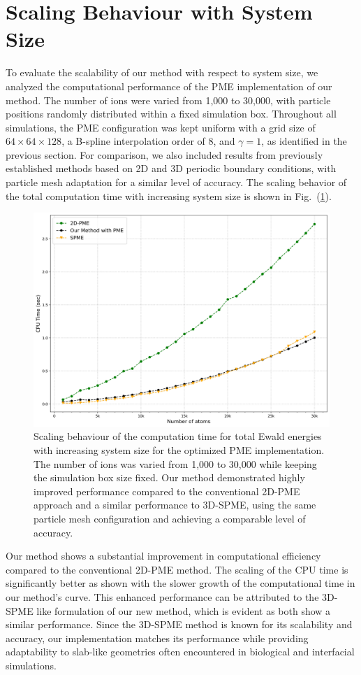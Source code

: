 \section{Scaling Behaviour with System Size}
To evaluate the scalability of our method with respect to system size, we analyzed the computational performance of the PME implementation of our method. The number of ions were varied from 1,000 to 30,000, with particle positions randomly distributed within a fixed simulation box. Throughout all simulations, the PME configuration was kept uniform with a grid size of $64 \times 64 \times 128$, a B-spline interpolation order of 8, and $\gamma = 1$, as identified in the previous section. For comparison, we also included results from previously established methods based on 2D and 3D periodic boundary conditions, with particle mesh adaptation for a similar level of accuracy. The scaling behavior of the total computation time with increasing system size is shown in Fig.~(\ref{fig:scaling_results}). 
\begin{figure}[]
    \centering
    \includegraphics[width=\linewidth]{images/Scaling_behaviour_Result30k.jpg}
    \caption{Scaling behaviour of the computation time for total Ewald energies with increasing system size for the optimized PME implementation. The number of ions was varied from 1,000 to 30,000 while keeping the simulation box size fixed.  Our method demonstrated highly improved performance compared to the conventional \ac{2D-PME} approach and a similar performance to 3D-\ac{SPME}, using the same particle mesh configuration and achieving a comparable level of accuracy.}
    \label{fig:scaling_results}
\end{figure}
Our method shows a substantial improvement in computational efficiency compared to the conventional \ac{2D-PME} method. The scaling of the CPU time is significantly better as shown with the slower growth of the computational time in our method's curve. This enhanced performance can be attributed to the 3D-\ac{SPME} like formulation of our new method, which is evident as both show a similar performance. Since the 3D-SPME method is known for its scalability and accuracy, our implementation matches its performance while providing adaptability to slab-like geometries often encountered in biological and interfacial simulations. 